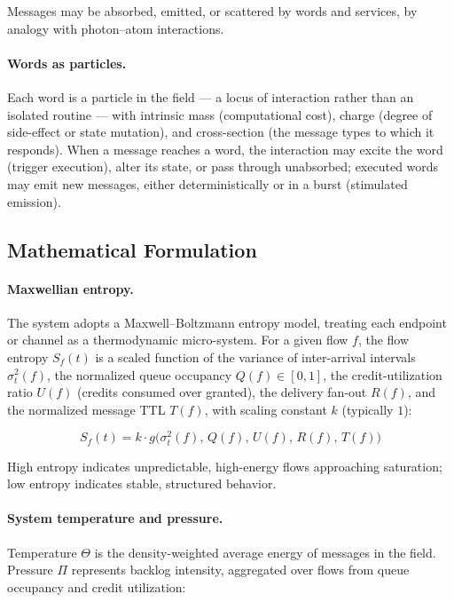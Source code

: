 Messages may be absorbed, emitted, or scattered by words and services, by analogy
with photon--atom interactions.

\paragraph{Words as particles.} Each word is a particle in the field --- a locus of
interaction rather than an isolated routine --- with intrinsic mass (computational
cost), charge (degree of side-effect or state mutation), and cross-section (the
message types to which it responds). When a message reaches a word, the interaction
may excite the word (trigger execution), alter its state, or pass through
unabsorbed; executed words may emit new messages, either deterministically or in a
burst (stimulated emission).

\subsection{Mathematical Formulation}

\paragraph{Maxwellian entropy.} The system adopts a Maxwell--Boltzmann entropy model,
treating each endpoint or channel as a thermodynamic micro-system. For a given flow
$f$, the flow entropy $S_f(t)$ is a scaled function of the variance of inter-arrival
intervals $\sigma^2_t(f)$, the normalized queue occupancy $Q(f) \in [0,1]$, the
credit-utilization ratio $U(f)$ (credits consumed over granted), the delivery fan-out
$R(f)$, and the normalized message TTL $T(f)$, with scaling constant $k$ (typically
$1$):

\begin{equation}
S_f(t) = k \cdot g\bigl(\sigma^2_t(f),\, Q(f),\, U(f),\, R(f),\, T(f)\bigr)
\end{equation}


High entropy indicates unpredictable, high-energy flows approaching saturation; low
entropy indicates stable, structured behavior.

\paragraph{System temperature and pressure.} Temperature $\Theta$ is the
density-weighted average energy of messages in the field. Pressure $\Pi$ represents
backlog intensity, aggregated over flows from queue occupancy and credit utilization:

